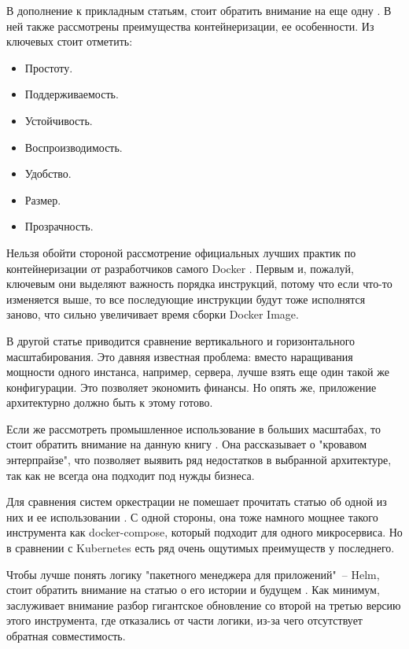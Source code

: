 В дополнение к прикладным статьям, стоит обратить внимание на еще одну \cite{gruening2018recommendations}. В ней также рассмотрены преимущества контейнеризации, ее особенности. Из ключевых стоит отметить:
\begin{itemize}
    \item Простоту.
    \item Поддерживаемость.
    \item Устойчивость.
    \item Воспроизводимость.
    \item Удобство.
    \item Размер.
    \item Прозрачность.
\end{itemize}

Нельзя обойти стороной рассмотрение официальных лучших практик по контейнеризации от разработчиков самого Docker \cite{docker:best-practicies}. Первым и, пожалуй, ключевым они выделяют важность порядка инструкций, потому что если что-то изменяется выше, то все последующие инструкции будут тоже исполнятся заново, что сильно увеличивает время сборки Docker Image.

В другой статье \cite{wang2019developing} приводится сравнение вертикального и горизонтального масштабирования. Это давняя известная проблема: вместо наращивания мощности одного инстанса, например, сервера, лучше взять еще один такой же конфигурации. Это позволяет экономить финансы. Но опять же, приложение архитектурно должно быть к этому готово.

Если же рассмотреть промышленное использование в больших масштабах, то стоит обратить внимание на данную книгу \cite{indrasiri2018microservices}. Она рассказывает о "кровавом энтерпрайзе", что позволяет выявить ряд недостатков в выбранной архитектуре, так как не всегда она подходит под нужды бизнеса.

Для сравнения систем оркестрации не помешает прочитать статью об одной из них и ее использовании \cite{naik2016building}. С одной стороны, она тоже намного мощнее такого инструмента как docker-compose, который подходит для одного микросервиса. Но в сравнении с Kubernetes есть ряд очень ощутимых преимуществ у последнего.

Чтобы лучше понять логику "пакетного менеджера для приложений"\ -- Helm, стоит обратить внимание на статью о его истории и будущем \cite{habr:flant:helm}. Как минимум, заслуживает внимание разбор гигантское обновление со второй на третью версию этого инструмента, где отказались от части логики, из-за чего отсутствует обратная совместимость.


